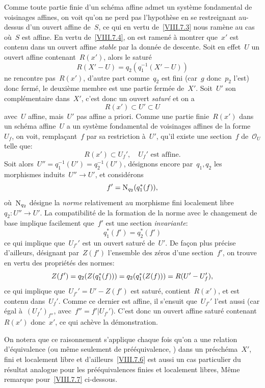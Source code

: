 Comme toute partie finie d'un sch\'ema affine admet un syst\`eme
fondamental de voisinages affines, on voit qu'on ne perd pas
l'hypoth\`ese en se restreignant au-dessus d'un ouvert affine
de~$S$, ce qui en vertu de~\ref{VIII.7.3} nous ram\`ene au cas
o\`u~$S$ est affine. En vertu de~\ref{VIII.7.4}, on est ramen\'e
\`a montrer
que~$x'$
est contenu
dans un ouvert affine \emph{stable} par la donn\'ee de
descente. Soit en effet~$U$ un ouvert affine contenant~$R(x')$, alors
le satur\'e
$$
R(X'-U)=q_{2}(q_{1}^{-1}(X'-U))
$$
ne rencontre pas~$R(x')$, d'autre part comme~$q_{2}$ est fini (car~$g$
donc~$p_{2}$ l'est) donc ferm\'e, le deuxi\`eme membre est une
partie ferm\'ee de~$X'$. Soit~$U'$ son compl\'ementaire dans~$X'$,
c'est donc un ouvert \emph{saturé} et on a
$$
R(x')\subset U'\subset U
$$
avec~$U$ affine, mais~$U'$ pas affine a priori. Comme une partie
finie~$R(x')$ dans un sch\'ema affine~$U$ a un syst\`eme
fondamental de voisinages affines de la forme~$U_{f}$, on voit,
rempla\c cant~$f$ par sa restriction \`a~$U'$, qu'il existe une
section~$f$ de~$\mathcal{O}_{U}$ telle que:
$$
R(x')\subset U_{f}',\quad U_{f}'\textrm{ est affine}.
$$
Soit alors~$U''=q_{1}^{-1}(U')=q_{2}^{-1}(U')$, d\'esignons encore
par~$q_{1},q_{2}$ les morphismes induits~$U''\to U'$, et
consid\'erons
$$
f'=\operatorname{N}_{q_{2}}(q_{1}^*(f)),
$$
o\`u~$\operatorname{N}_{q_{2}}$ d\'esigne la \emph{norme} relativement au
morphisme fini localement libre~$q_{2}\colon U''\to U'$. La
compatibilit\'e de la formation de la norme avec le changement de
base implique facilement que~$f'$ est une section \emph{invariante}:
$$
q_{1}^*(f')=q_{2}^*(f')
$$
ce qui implique que~$U_{f'}'$ est un ouvert satur\'e de~$U'$. De
fa\c con plus pr\'ecise d'ailleurs, d\'esignant par~$Z(f')$
l'ensemble des z\'eros d'une section~$f'$, on trouve en vertu des
propri\'et\'es des normes:
$$
Z(f')=q_{2}(Z(q_{1}^*(f)))=q_{2}(q_{1}^*(Z(f)))=
R(U'-U_{f}'),
$$
ce
qui implique que~$U_{f'}'=U'-Z(f')$ est satur\'e, contient~$R(x')$,
et est contenu dans~$U_{f}'$. Comme ce dernier est affine, il s'ensuit
que~$U_{f'}'$ l'est aussi (car \'egal \`a~$(U_{f}')_{f''}$,
avec~$f''=f'|U_{f'}'$). C'est donc un ouvert affine satur\'e
contenant~$R(x')$ donc~$x'$, ce qui ach\`eve la d\'emonstration.

On notera que ce raisonnement s'applique chaque fois qu'on a une
relation d'\'equivalence (ou m\^eme seulement de
pr\'e\'equivalence, \cf \cite{VIII.3}) dans un pr\'esch\'ema~$X'$, fini
et localement libre et d'ailleurs~\ref{VIII.7.6} est aussi un cas
particulier du r\'esultat analogue pour les pr\'e\'equivalences
finies et localement libres, \cf \loccit M\^eme remarque
pour~\ref{VIII.7.7} ci-dessous.

